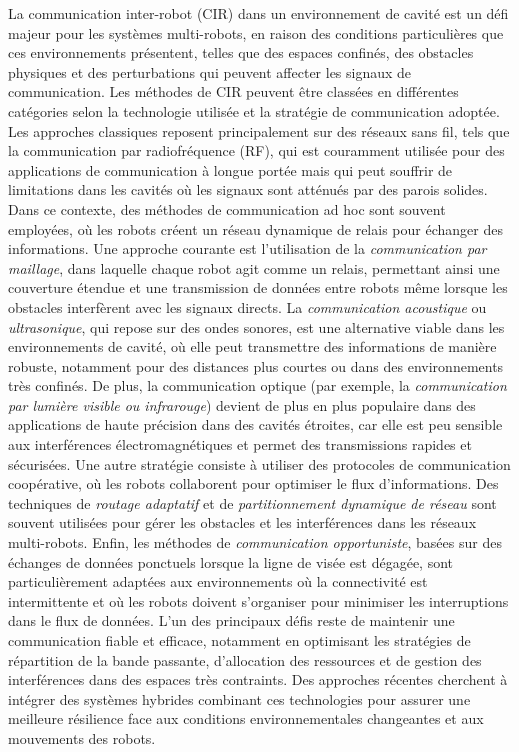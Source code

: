 \documentclass[../main.tex]{subfiles}
\begin{document}
La communication inter-robot (CIR) dans un environnement de cavité est un défi majeur pour les systèmes multi-robots, en raison des conditions particulières que ces environnements présentent, telles que des espaces confinés, des obstacles physiques et des perturbations qui peuvent affecter les signaux de communication. Les méthodes de CIR peuvent être classées en différentes catégories selon la technologie utilisée et la stratégie de communication adoptée. Les approches classiques reposent principalement sur des réseaux sans fil, tels que la communication par radiofréquence (RF), qui est couramment utilisée pour des applications de communication à longue portée mais qui peut souffrir de limitations dans les cavités où les signaux sont atténués par des parois solides. Dans ce contexte, des méthodes de communication ad hoc sont souvent employées, où les robots créent un réseau dynamique de relais pour échanger des informations. Une approche courante est l'utilisation de la \textit{communication par maillage}, dans laquelle chaque robot agit comme un relais, permettant ainsi une couverture étendue et une transmission de données entre robots même lorsque les obstacles interfèrent avec les signaux directs. La \textit{communication acoustique} ou \textit{ultrasonique}, qui repose sur des ondes sonores, est une alternative viable dans les environnements de cavité, où elle peut transmettre des informations de manière robuste, notamment pour des distances plus courtes ou dans des environnements très confinés. De plus, la communication optique (par exemple, la \textit{communication par lumière visible ou infrarouge}) devient de plus en plus populaire dans des applications de haute précision dans des cavités étroites, car elle est peu sensible aux interférences électromagnétiques et permet des transmissions rapides et sécurisées. Une autre stratégie consiste à utiliser des protocoles de communication coopérative, où les robots collaborent pour optimiser le flux d'informations. Des techniques de \textit{routage adaptatif} et de \textit{partitionnement dynamique de réseau} sont souvent utilisées pour gérer les obstacles et les interférences dans les réseaux multi-robots. Enfin, les méthodes de \textit{communication opportuniste}, basées sur des échanges de données ponctuels lorsque la ligne de visée est dégagée, sont particulièrement adaptées aux environnements où la connectivité est intermittente et où les robots doivent s'organiser pour minimiser les interruptions dans le flux de données. L'un des principaux défis reste de maintenir une communication fiable et efficace, notamment en optimisant les stratégies de répartition de la bande passante, d'allocation des ressources et de gestion des interférences dans des espaces très contraints. Des approches récentes cherchent à intégrer des systèmes hybrides combinant ces technologies pour assurer une meilleure résilience face aux conditions environnementales changeantes et aux mouvements des robots. 
\end{document}
